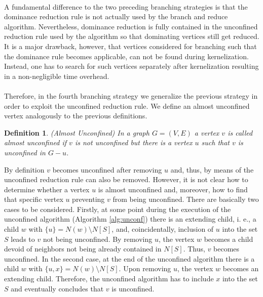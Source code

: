 \documentclass[]{article}
\newtheorem{definition}{Definition}
\begin{document}
\paragraph{}
A fundamental difference to the two preceding branching strategies is that the dominance reduction rule is not actually used by the branch and reduce algorithm. Nevertheless, dominance reduction is fully contained in the unconfined reduction rule used by the algorithm so that dominating vertices still get reduced. It is a major drawback, however, that vertices considered for branching such that the dominance rule becomes applicable, can not be found during kernelization. Instead, one has to search for such vertices separately after kernelization resulting in a non-negligible time overhead. 

\paragraph{}
Therefore, in the fourth branching strategy we generalize the previous strategy in order to exploit the unconfined reduction rule. We define an almost unconfined vertex analogously to the previous definitions.

\begin{definition} (Almost Unconfined)
	In a graph $G=(V,E)$ a vertex $v$ is called almost unconfined if $v$ is not unconfined but there is a vertex $u$ such that $v$ is unconfined in $G-u$.
\end{definition}

By definition $v$ becomes unconfined after removing $u$ and, thus, by means of the unconfined reduction rule can also be removed. However, it is not clear how to determine whether a vertex $u$ is almost unconfined and, moreover, how to find that specific vertex $u$ preventing $v$ from being unconfined. There are basically two cases to be considered. Firstly, at some point during the execution of the unconfined algorithm (Algorithm \ref{alg:unconf}) there is an extending child, i. e., a child $w$ with $\{u\} = N(w) \setminus N[S]$, and, coincidentally, inclusion of $u$ into the set $S$ leads to $v$ not being unconfined. By removing $u$, the vertex $w$ becomes a child devoid of neighbors not being already contained in $N[S]$. Thus, $v$ becomes unconfined. In the second case, at the end of the unconfined algorithm there is a child $w$ with $\{u,x\} = N(w) \setminus N[S]$. Upon removing $u$, the vertex $w$ becomes an extending child. Therefore, the unconfined algorithm has to include $x$ into the set $S$ and eventually concludes that $v$ is unconfined. 
\end{document}
